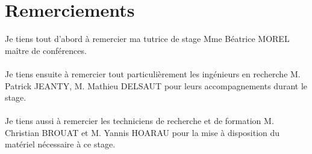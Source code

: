 \documentclass[12pt,a4paper]{article}
\begin{document}
\section*{Remerciements}
\sf
Je tiens tout d'abord à remercier ma tutrice de stage Mme Béatrice MOREL maître de conférences.\\
~\\
Je tiens ensuite à remercier tout particulièrement les ingénieurs en recherche M. Patrick JEANTY, M. Mathieu DELSAUT pour leurs accompagnements durant le stage.\\
~\\
Je tiens aussi à remercier les techniciens de recherche et de formation M. Christian BROUAT et M. Yannis HOARAU pour la mise à disposition du matériel nécessaire à ce stage.
 
 
~


\newpage







\thispagestyle{empty}
\renewcommand{\contentsname}{Sommaire}
\tableofcontents
\newpage

\newpage
\end{document}

